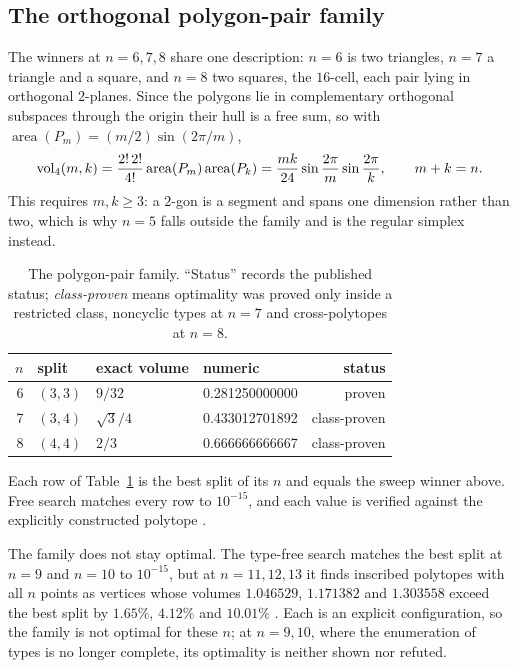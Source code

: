\subsection{The orthogonal polygon-pair family}

The winners at $n = 6, 7, 8$ share one description: $n = 6$ is two triangles,
$n = 7$ a triangle and a square, and $n = 8$ two squares, the $16$-cell, each
pair lying in orthogonal $2$-planes. Since the polygons lie in complementary
orthogonal subspaces through the origin their hull is a free sum, so with
$\operatorname{area}(P_{m}) = (m/2)\sin(2\pi/m)$,
\begin{equation}
  \label{eq:polygonpair}
  \operatorname{vol}_{4}(m,k)
  = \frac{2!\,2!}{4!}\operatorname{area}(P_{m})\operatorname{area}(P_{k})
  = \frac{mk}{24}\sin\frac{2\pi}{m}\sin\frac{2\pi}{k},
  \qquad m + k = n .
\end{equation}
This requires $m, k \geq 3$: a $2$-gon is a segment and spans one dimension
rather than two, which is why $n = 5$ falls outside the family and is the
regular simplex instead.

\begin{table}[ht]
  \caption{The polygon-pair family. ``Status'' records the published status;
    \emph{class-proven} means optimality was proved only inside a restricted
    class, noncyclic types at $n = 7$ and cross-polytopes at $n = 8$.}
  \label{tab:pair}
  \begin{tabular}{rlllr}
    \toprule
    $n$ & split & exact volume & numeric & status \\
    \midrule
    6  & $(3,3)$ & $9/32$ & 0.281250000000 & proven \\
    7  & $(3,4)$ & $\sqrt{3}/4$ & 0.433012701892 & class-proven \\
    8  & $(4,4)$ & $2/3$ & 0.666666666667 & class-proven \\
    \bottomrule
  \end{tabular}
\end{table}

Each row of Table~\ref{tab:pair} is the best split of its $n$ and equals the
sweep winner above. Free search  matches every row to $10^{-15}$,
and each value is verified against the explicitly constructed polytope
 .

The family does not stay optimal. The type-free search  matches
the best split at $n = 9$ and $n = 10$ to $10^{-15}$, but at $n = 11, 12, 13$
it finds inscribed polytopes with all $n$ points as vertices whose volumes
$1.046529$, $1.171382$ and $1.303558$ exceed the best split by $1.65\%$,
$4.12\%$ and $10.01\%$ . Each is an explicit configuration,
so the family is not optimal for these $n$; at $n = 9, 10$, where the
enumeration of types is no longer complete, its optimality is neither shown nor
refuted.
